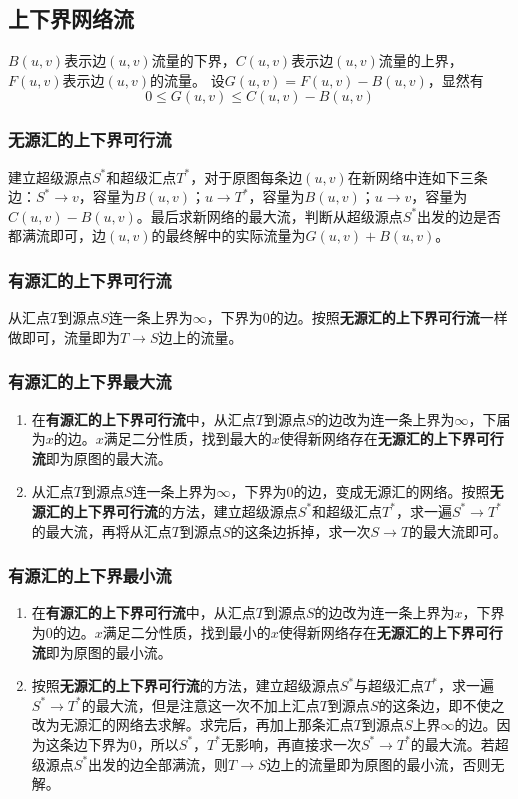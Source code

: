 \documentclass[a4paper]{article}
\begin{document}
\subsection{上下界网络流}
$B(u,v)$表示边$(u,v)$流量的下界，$C(u,v)$表示边$(u,v)$流量的上界，$F(u,v)$表示边$(u,v)$的流量。
设$G(u,v) = F(u,v) - B(u,v)$，显然有
$$0 \leq G(u,v) \leq C(u,v)-B(u,v)$$

\subsubsection*{无源汇的上下界可行流}
建立超级源点$S^*$和超级汇点$T^*$，对于原图每条边$(u,v)$在新网络中连如下三条边：$S^* \rightarrow v$，容量为$B(u,v)$；$u \rightarrow T^*$，容量为$B(u,v)$；$u \rightarrow v$，容量为$C(u,v) - B(u,v)$。最后求新网络的最大流，判断从超级源点$S^*$出发的边是否都满流即可，边$(u,v)$的最终解中的实际流量为$G(u,v)+B(u,v)$。

\subsubsection*{有源汇的上下界可行流}
从汇点$T$到源点$S$连一条上界为$\infty$，下界为$0$的边。按照\textbf{无源汇的上下界可行流}一样做即可，流量即为$T \rightarrow S$边上的流量。

\subsubsection*{有源汇的上下界最大流}
\begin{enumerate}
	\item 在\textbf{有源汇的上下界可行流}中，从汇点$T$到源点$S$的边改为连一条上界为$\infty$，下届为$x$的边。$x$满足二分性质，找到最大的$x$使得新网络存在\textbf{无源汇的上下界可行流}即为原图的最大流。
	\item 从汇点$T$到源点$S$连一条上界为$\infty$，下界为$0$的边，变成无源汇的网络。按照\textbf{无源汇的上下界可行流}的方法，建立超级源点$S^*$和超级汇点$T^*$，求一遍$S^* \rightarrow T^*$的最大流，再将从汇点$T$到源点$S$的这条边拆掉，求一次$S \rightarrow T$的最大流即可。
\end{enumerate}

\subsubsection*{有源汇的上下界最小流}
\begin{enumerate}
	\item 在\textbf{有源汇的上下界可行流}中，从汇点$T$到源点$S$的边改为连一条上界为$x$，下界为$0$的边。$x$满足二分性质，找到最小的$x$使得新网络存在\textbf{无源汇的上下界可行流}即为原图的最小流。
	\item 按照\textbf{无源汇的上下界可行流}的方法，建立超级源点$S^*$与超级汇点$T^*$，求一遍$S^* \rightarrow T^*$的最大流，但是注意这一次不加上汇点$T$到源点$S$的这条边，即不使之改为无源汇的网络去求解。求完后，再加上那条汇点$T$到源点$S$上界$\infty$的边。因为这条边下界为$0$，所以$S^*$，$T^*$无影响，再直接求一次$S^* \rightarrow T^*$的最大流。若超级源点$S^*$出发的边全部满流，则$T \rightarrow S$边上的流量即为原图的最小流，否则无解。
\end{enumerate}
\end{document}
